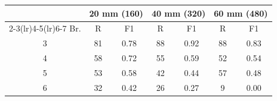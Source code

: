 \begin{tabular}{@{}ccccccc@{}}
\toprule
& \multicolumn{2}{c}{20 mm (160)} & \multicolumn{2}{c}{40 mm (320)} & \multicolumn{2}{c}{60 mm (480)}\\
\cmidrule(lr){2-3}\cmidrule(lr){4-5}\cmidrule(lr){6-7}
Br. & R & F1 & R & F1 & R & F1\\
\midrule
3 & 81 & 0.78 & 88 & 0.92 & 88 & 0.83\\
4 & 58 & 0.72 & 55 & 0.59 & 52 & 0.54\\
5 & 53 & 0.58 & 42 & 0.44 & 57 & 0.48\\
6 & 32 & 0.42 & 26 & 0.27 & 9 & 0.00\\
\bottomrule
\end{tabular}
